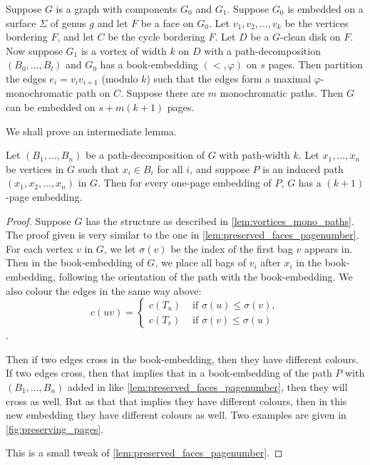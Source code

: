\begin{lemma}\label{lem:vortices_mono_paths}
	Suppose \(G\) is a graph with components \(G_0\) and \(G_1\). Suppose \(G_0\) is embedded on a surface \(\Sigma \) of genus \(g\) and let \(F\) be a face on \(G_0\). Let \(v_1, v_2, \ldots, v_k\) be the vertices bordering \(F\), and let \(C\) be the cycle bordering \(F\). Let \(D\) be a \(G\)-clean disk on \(F\). Now suppose \(G_1\) is a vortex of width $k$ on \(D\) with a path-decomposition \((B_0, \ldots, B_l)\) and \(G_0\) has a book-embedding \((<, \varphi)\) on $s$ pages. Then partition the edges \(e_i = v_i v_{i + 1}\) (modulo \(k\)) such that the edges form a maximal \(\varphi \)-monochromatic path on \(C\). Suppose there are \(m\) monochromatic paths. Then \(G\) can be embedded on \(s + m(k+1)\) pages.
\end{lemma}
We shall prove an intermediate lemma.
\begin{lemma}\label{lem:one_page_decomposition}
	Let \((B_1, \ldots, B_n)\) be a path-decomposition of \(G\) with path-width \(k\). Let \(x_1, \ldots, x_n\) be vertices in \(G\) such that \(x_i \in B_i\) for all \(i\), and suppose \(P\) is an induced path \((x_1, x_2, \ldots, x_n)\) in \(G\). Then for every one-page embedding of \(P\), \(G\) has a \((k + 1)\)-page embedding.
\end{lemma}
\begin{proof}
	Suppose \(G\) has the structure as described in \cref{lem:vortices_mono_paths}. 
	The proof given is very similar to the one in \cref{lem:preserved_faces_pagenumber}. For each vertex \(v\) in \(G\), we let \(\sigma(v)\) be the index of the first bag \(v\) appears in. Then in the book-embedding of \(G\), we place all bags of \(v_i\) after \(x_i\) in the book-embedding, following the orientation of the path with the book-embedding. We also colour the edges in the same way above: 
	\begin{equation}
		c(uv) =
		\begin{cases}
			c(T_u) & \text{ if } \sigma(u) \leq \sigma(v), \\
			c(T_v) & \text{ if } \sigma(v) \leq \sigma(u)
		\end{cases}
	\end{equation}.

	Then if two edges cross in the book-embedding, then they have different colours. If two edges cross, then that implies that in a book-embedding of the path \(P\) with \((B_1, \ldots, B_n)\) added in like \cref{lem:preserved_faces_pagenumber}, then they will cross as well. But as that that implies they have different colours, then in this new embedding they have different colours as well. Two examples are given in \cref{fig:preserving_pages}.

	This is a small tweak of \cref{lem:preserved_faces_pagenumber}. 
\end{proof}

